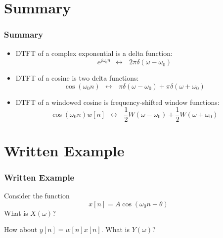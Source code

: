 \documentclass{beamer}
\begin{document}
\section[Summary]{Summary}
\setcounter{subsection}{1}

\begin{frame}
  \frametitle{Summary}

  \begin{itemize}
  \item DTFT of a complex exponential is a delta function:
    \begin{displaymath}
      e^{j\omega_0 n}~~\leftrightarrow~~~2\pi\delta(\omega-\omega_0)
    \end{displaymath}
  \item DTFT of a cosine is two delta functions:
    \begin{displaymath}
      \cos(\omega_0 n)~~\leftrightarrow~~~\pi\delta(\omega-\omega_0)+\pi\delta(\omega+\omega_0)
    \end{displaymath}
  \item DTFT of a windowed cosine is frequency-shifted window functions:
    \begin{displaymath}
      \cos(\omega_0 n)w[n]~~\leftrightarrow~~~\frac{1}{2}W(\omega-\omega_0)+\frac{1}{2}W(\omega+\omega_0)
    \end{displaymath}
  \end{itemize}
\end{frame}

\section[Example]{Written Example}
\setcounter{subsection}{1}

\begin{frame}
  \frametitle{Written Example}

  Consider the function
  \[
  x[n] = A \cos(\omega_0 n+\theta)
  \]
  What is $X(\omega)$?

  How about $y[n]=w[n]x[n]$.  What is $Y(\omega)$?
\end{frame}
\end{document}
